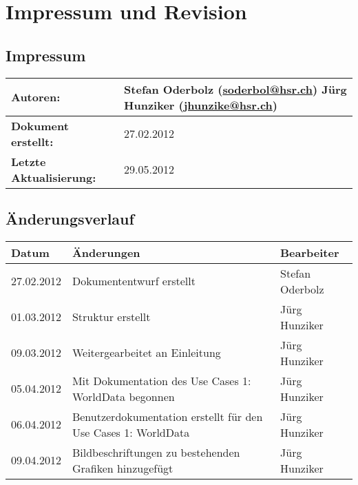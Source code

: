 \chapter*{Impressum und Revision}

\section*{Impressum}
\begin{longtable}{|l|p{11cm}|}
\hline 
\textbf{Autoren:} & Stefan Oderbolz (\url{soderbol@hsr.ch}) \newline
Jürg Hunziker (\url{jhunzike@hsr.ch}) \\ 
\hline 
\textbf{Dokument erstellt:} & 27.02.2012 \\ 
\hline 
\textbf{Letzte Aktualisierung:} & 29.05.2012 \\ 
\hline 
\end{longtable}

\section*{Änderungsverlauf}

\begin{longtable}{|p{2cm}|p{10cm}|p{3cm}|}
\hline 
\textbf{Datum} & \textbf{Änderungen} & \textbf{Bearbeiter} \\ 
\hline 
27.02.2012 & Dokumententwurf erstellt & Stefan Oderbolz \\ 
\hline 
01.03.2012 & Struktur erstellt & Jürg Hunziker \\ 
\hline 
09.03.2012 & Weitergearbeitet an Einleitung & Jürg Hunziker \\ 
\hline 
05.04.2012 & Mit Dokumentation des Use Cases 1: WorldData begonnen & Jürg Hunziker \\ 
\hline 
06.04.2012 & Benutzerdokumentation erstellt für den Use Cases 1: WorldData & Jürg Hunziker \\ 
\hline 
09.04.2012 & Bildbeschriftungen zu bestehenden Grafiken hinzugefügt & Jürg Hunziker \\ 
\hline 
\end{longtable} 